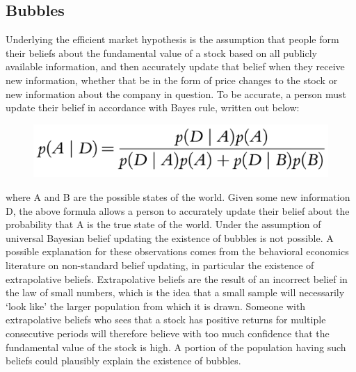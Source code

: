 \documentclass[10pt,twocolumn]{article}
\begin{document}
\subsection{Bubbles}
Underlying the efficient market hypothesis is the assumption that people form their beliefs about the fundamental value of a stock based on all publicly available information, and then accurately update that belief when they receive new information, whether that be in the form of price changes to the stock or new information about the company in question. To be accurate, a person must update their belief in accordance with Bayes rule, written out below:
\begin{figure}[H]
    \centering
    \includegraphics[width=1\linewidth]{images/EMH1.png}
\end{figure}

\noindent where A and B are the possible states of the world. Given some new information D, the above formula allows a person to accurately update their belief about the probability that A is the true state of the world. Under the assumption of universal Bayesian belief updating the existence of bubbles is not possible. A possible explanation for these observations comes from the behavioral economics literature on non-standard belief updating, in particular the existence of extrapolative beliefs. Extrapolative beliefs are the result of an incorrect belief in the law of small numbers, which is the idea that a small sample will necessarily ‘look like’ the larger population from which it is drawn. Someone with extrapolative beliefs who sees that a stock has positive returns for multiple consecutive periods will therefore believe with too much confidence that the fundamental value of the stock is high. A portion of the population having such beliefs could plausibly explain the existence of bubbles.
\end{document}
